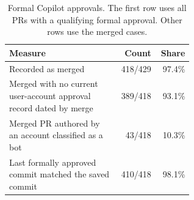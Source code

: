 \begin{table}[H]
\centering
\caption{Formal Copilot approvals. The first row uses all PRs with a qualifying formal approval. Other rows use the merged cases.}
\label{tab:formal}
\small
\begin{tabular}{@{}p{0.60\linewidth}rr@{}}
\toprule
Measure & Count & Share \\
\midrule
Recorded as merged & 418/429 & 97.4\% \\
Merged with no current user-account approval record dated by merge & 389/418 & 93.1\% \\
Merged PR authored by an account classified as a bot & 43/418 & 10.3\% \\
Last formally approved commit matched the saved commit & 410/418 & 98.1\% \\
\bottomrule
\end{tabular}
\end{table}
